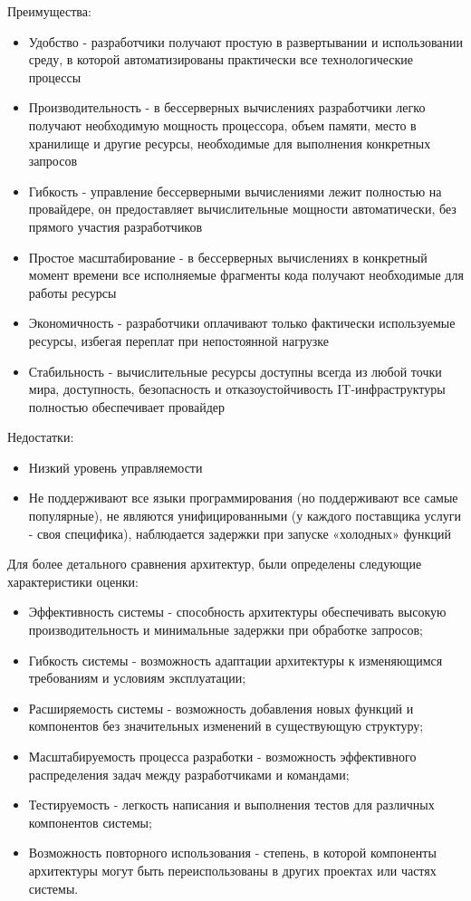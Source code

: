 \documentclass[utf8, russian]{eskdtext}
\begin{document}
\begin{enumerate}
 Преимущества:
 \begin{itemize}
     \item Удобство - разработчики получают простую в развертывании и использовании среду, в которой автоматизированы практически все технологические процессы
     \item Производительность - в бессерверных вычислениях разработчики легко получают необходимую мощность процессора, объем памяти, место в хранилище и другие ресурсы, необходимые для выполнения конкретных запросов
     \item Гибкость - управление бессерверными вычислениями лежит полностью на провайдере, он предоставляет вычислительные мощности автоматически, без прямого участия разработчиков
     \item Простое масштабирование - в бессерверных вычислениях в конкретный момент времени все исполняемые фрагменты кода получают необходимые для работы ресурсы
     \item Экономичность - разработчики оплачивают только фактически используемые ресурсы, избегая переплат при непостоянной нагрузке
     \item Стабильность - вычислительные ресурсы доступны всегда из любой точки мира, доступность, безопасность и отказоустойчивость IT-инфраструктуры полностью обеспечивает провайдер
 \end{itemize}
 
 Недостатки:
 \begin{itemize}
     \item Низкий уровень управляемости
     \item Не поддерживают все языки программирования (но поддерживают все самые популярные), не являются унифицированными (у каждого поставщика услуги - своя специфика), наблюдается задержки при запуске «холодных» функций
 \end{itemize}
 \end{enumerate}
 

 Для более детального сравнения архитектур, были определены следующие характеристики оценки:
 
 \begin{itemize}
     \item Эффективность системы - способность архитектуры обеспечивать высокую производительность и минимальные задержки при обработке запросов;
     \item Гибкость системы - возможность адаптации архитектуры к изменяющимся требованиям и условиям эксплуатации;
     \item Расширяемость системы - возможность добавления новых функций и компонентов без значительных изменений в существующую структуру;
     \item Масштабируемость процесса разработки - возможность эффективного распределения задач между разработчиками и командами;
     \item Тестируемость - легкость написания и выполнения тестов для различных компонентов системы;
     \item Возможность повторного использования - степень, в которой компоненты архитектуры могут быть переиспользованы в других проектах или частях системы.
 \end{itemize}
 
\end{document}
